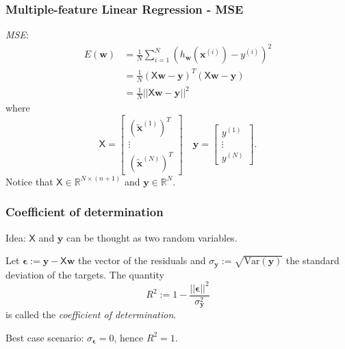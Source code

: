 \documentclass{beamer}
\begin{document}
	\begin{frame}
		\frametitle{Multiple-feature Linear Regression - MSE}
		\textsl{MSE}:
		\begin{align*}
			E(\bm{w}) &= \frac{1}{N} \sum_{i=1}^{N} (h_{\bm{w}}(\bm{x}^{(i)}) - y^{(i)})^2\\
			&= \frac{1}{N} (\mathsf{X} \bm{w} - \bm{y})^T (\mathsf{X}\bm{w} - \bm{y})\\
			&= \frac{1}{N} ||\mathsf{X}\bm{w} - \bm{y}||^2
		\end{align*}
		where
		\begin{equation*}
			\mathsf{X} = \begin{bmatrix}
				(\tilde{\bm{x}}^{(1)})^T\\
				\vdots\\
				(\tilde{\bm{x}}^{(N)})^T
			\end{bmatrix} \quad \bm{y} = \begin{bmatrix}
			y^{(1)} \\
			\vdots\\
			y^{(N)}
		\end{bmatrix}.
		\end{equation*}
	Notice that $\mathsf{X} \in \mathbb{R}^{N \times (n+1)}$ and $\bm{y} \in \mathbb{R}^N$.
	\end{frame}

	\begin{frame}
		\frametitle{Coefficient of determination}
		Idea: $\mathsf{X}$ and $\bm{y}$ can be thought as two random variables.
		
		\vspace{5mm}
		
		Let $\bm{\epsilon} := \bm{y} - \mathsf{X}\bm{w}$ the vector of the residuals and $\sigma_{\bm{y}}:= \sqrt{\text{Var}(\bm{y})}$ the standard deviation of the targets.  The quantity
		\begin{equation*}
			R^2 := 1 - \frac{||\bm{\epsilon}||^2}{\sigma_{\bm{y}}^2}
		\end{equation*}
		is called the \textsl{coefficient of determination}.
		
		\vspace{5mm}
		
		Best case scenario: $\sigma_{\bm{\epsilon}} = 0$, hence $R^2 = 1$.
		
	\end{frame}
\end{document}
